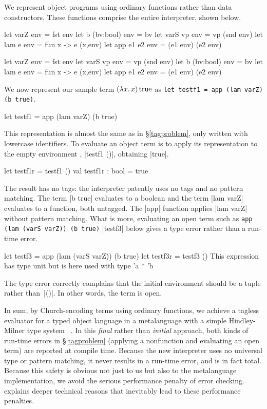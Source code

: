 We represent object programs using ordinary functions rather than
data constructors.  These functions comprise the entire interpreter, shown
below.
\ifshort
\begin{code3}
let varZ env    = fst env         let b (bv:bool) env = bv
let varS vp env = vp (snd env)    let lam e env   = fun x -> e (x,env)
let app e1 e2 env   = (e1 env) (e2 env)
\end{code3}
\else
\begin{code}
let varZ env        = fst env
let varS vp env     = vp (snd env)
let b (bv:bool) env = bv
let lam e env       = fun x -> e (x,env)
let app e1 e2 env   = (e1 env) (e2 env)
\end{code}
\fi
We now represent our sample term $(\mathopen{\lambda\mathord{x}.\,}x)\mathinner{\mathrm{true}}$ as
\ifshort
\texttt{let testf1 = app (lam varZ) (b true)}.
\else
\begin{code}
let testf1 = app (lam varZ) (b true)
\end{code}
\fi
This representation is almost the same as in \S\ref{tagproblem}, only
written with lowercase identifiers. To evaluate an object term is to
apply its representation to the empty environment\ifshort
, |testf1 ()|, obtaining |true|\fi.
\ifshort\else
\begin{code}
let testf1r = testf1 ()
val testf1r : bool = true
\end{code}
\fi
The result has no tags: the interpreter patently uses no tags and no
pattern matching. The term |b true| evaluates to a boolean and the term
|lam varZ| evaluates to a function, both untagged. The |app| function
applies |lam varZ| without pattern matching. What is more, evaluating an
open term such as
\ifshort
\texttt{app (lam (varS varZ)) (b true)}
\else
|testf3| below
\fi
gives a type error rather than a run-time error.
\ifshort\else
\begin{code}
let testf3 = app (lam (varS varZ)) (b true)
let testf3r = testf3 ()
This expression has type unit but is here used with type 'a * 'b
\end{code}
\fi
The type error correctly complains
that the initial environment should be a tuple rather than~|()|.
In other words, the term is open.

In sum, by Church\hyp encoding terms using ordinary functions, we
achieve a tagless evaluator for a typed object language in a
metalanguage with a simple 
\ifshort
Hindley-Milner \fi
type system\ifshort\else\ \cite{hindley-principal,milner-theory}\fi
.  In this \emph{final} rather
than \emph{initial} approach, both kinds of run-time errors in
\S\ref{tagproblem} (applying a nonfunction and evaluating an open
term) are reported at compile time. Because the new interpreter
uses no universal type or pattern matching, it never results in a
run-time error, and is in fact total.  Because this safety is obvious
not just to us but also to the metalanguage implementation, we avoid
the serious performance penalty \cite{WalidICFP02} of error checking.
 explains deeper technical reasons that
inevitably lead to these performance penalties.

